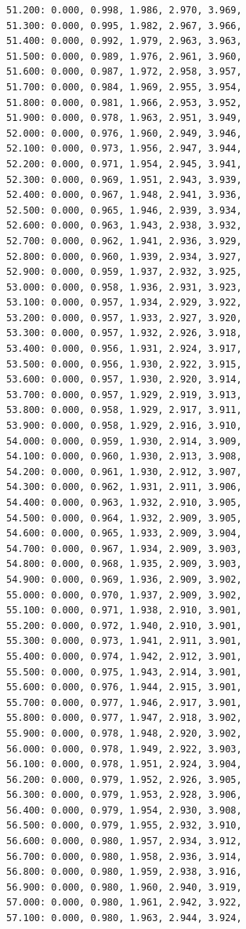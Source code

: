 \documentclass[12pt, a4paper]{article}
\begin{document}
\begin{scriptsize}
\begin{ttfamily}
\begin{lstlisting}
51.200: 0.000, 0.998, 1.986, 2.970, 3.969, 
51.300: 0.000, 0.995, 1.982, 2.967, 3.966, 
51.400: 0.000, 0.992, 1.979, 2.963, 3.963, 
51.500: 0.000, 0.989, 1.976, 2.961, 3.960, 
51.600: 0.000, 0.987, 1.972, 2.958, 3.957, 
51.700: 0.000, 0.984, 1.969, 2.955, 3.954, 
51.800: 0.000, 0.981, 1.966, 2.953, 3.952, 
51.900: 0.000, 0.978, 1.963, 2.951, 3.949, 
52.000: 0.000, 0.976, 1.960, 2.949, 3.946, 
52.100: 0.000, 0.973, 1.956, 2.947, 3.944, 
52.200: 0.000, 0.971, 1.954, 2.945, 3.941, 
52.300: 0.000, 0.969, 1.951, 2.943, 3.939, 
52.400: 0.000, 0.967, 1.948, 2.941, 3.936, 
52.500: 0.000, 0.965, 1.946, 2.939, 3.934, 
52.600: 0.000, 0.963, 1.943, 2.938, 3.932, 
52.700: 0.000, 0.962, 1.941, 2.936, 3.929, 
52.800: 0.000, 0.960, 1.939, 2.934, 3.927, 
52.900: 0.000, 0.959, 1.937, 2.932, 3.925, 
53.000: 0.000, 0.958, 1.936, 2.931, 3.923, 
53.100: 0.000, 0.957, 1.934, 2.929, 3.922, 
53.200: 0.000, 0.957, 1.933, 2.927, 3.920, 
53.300: 0.000, 0.957, 1.932, 2.926, 3.918, 
53.400: 0.000, 0.956, 1.931, 2.924, 3.917, 
53.500: 0.000, 0.956, 1.930, 2.922, 3.915, 
53.600: 0.000, 0.957, 1.930, 2.920, 3.914, 
53.700: 0.000, 0.957, 1.929, 2.919, 3.913, 
53.800: 0.000, 0.958, 1.929, 2.917, 3.911, 
53.900: 0.000, 0.958, 1.929, 2.916, 3.910, 
54.000: 0.000, 0.959, 1.930, 2.914, 3.909, 
54.100: 0.000, 0.960, 1.930, 2.913, 3.908, 
54.200: 0.000, 0.961, 1.930, 2.912, 3.907, 
54.300: 0.000, 0.962, 1.931, 2.911, 3.906, 
54.400: 0.000, 0.963, 1.932, 2.910, 3.905, 
54.500: 0.000, 0.964, 1.932, 2.909, 3.905, 
54.600: 0.000, 0.965, 1.933, 2.909, 3.904, 
54.700: 0.000, 0.967, 1.934, 2.909, 3.903, 
54.800: 0.000, 0.968, 1.935, 2.909, 3.903, 
54.900: 0.000, 0.969, 1.936, 2.909, 3.902, 
55.000: 0.000, 0.970, 1.937, 2.909, 3.902, 
55.100: 0.000, 0.971, 1.938, 2.910, 3.901, 
55.200: 0.000, 0.972, 1.940, 2.910, 3.901, 
55.300: 0.000, 0.973, 1.941, 2.911, 3.901, 
55.400: 0.000, 0.974, 1.942, 2.912, 3.901, 
55.500: 0.000, 0.975, 1.943, 2.914, 3.901, 
55.600: 0.000, 0.976, 1.944, 2.915, 3.901, 
55.700: 0.000, 0.977, 1.946, 2.917, 3.901, 
55.800: 0.000, 0.977, 1.947, 2.918, 3.902, 
55.900: 0.000, 0.978, 1.948, 2.920, 3.902, 
56.000: 0.000, 0.978, 1.949, 2.922, 3.903, 
56.100: 0.000, 0.978, 1.951, 2.924, 3.904, 
56.200: 0.000, 0.979, 1.952, 2.926, 3.905, 
56.300: 0.000, 0.979, 1.953, 2.928, 3.906, 
56.400: 0.000, 0.979, 1.954, 2.930, 3.908, 
56.500: 0.000, 0.979, 1.955, 2.932, 3.910, 
56.600: 0.000, 0.980, 1.957, 2.934, 3.912, 
56.700: 0.000, 0.980, 1.958, 2.936, 3.914, 
56.800: 0.000, 0.980, 1.959, 2.938, 3.916, 
56.900: 0.000, 0.980, 1.960, 2.940, 3.919, 
57.000: 0.000, 0.980, 1.961, 2.942, 3.922, 
57.100: 0.000, 0.980, 1.963, 2.944, 3.924, 

\end{lstlisting}
\end{ttfamily}
\end{scriptsize}
\end{document}
